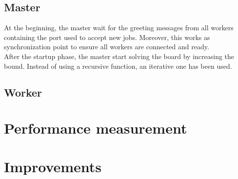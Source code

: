 \documentclass{article}
\begin{document}
\subsection{Master}
At the beginning, the master wait for the greeting messages from all workers containing the port used to accept new jobs. Moreover, this works as synchronization point to ensure all workers are connected and ready. \\
After the startup phase, the master start solving the board by increasing the bound. Instead of using a recursive function, an iterative one has been used.


\subsection{Worker}

\section{Performance measurement}

\section{Improvements}
\end{document}
